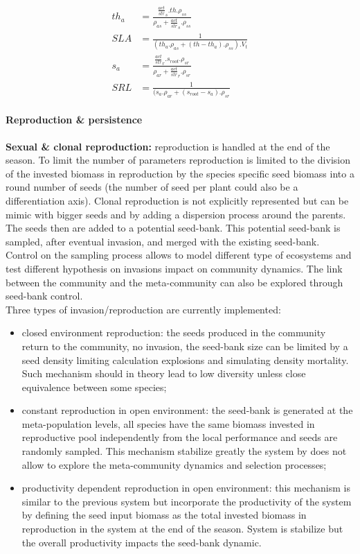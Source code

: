 \documentclass[a4paper,twoside, justified,marginals=raggedright]{tufte-handout}
\begin{document}
\begin{align}
  th_{a} &= \frac{\frac{act}{str}_{s} . th . \rho_{ss}}{\rho_{as} + \frac{act}{str}_{s} . \rho_{ss} }\\
  SLA &= \frac{1}{(th_{a} . \rho_{as} + (th - th_{a}) . \rho_{ss} ) . V_{t}}\\ 
  s_{a} &= \frac{\frac{act}{str}_{r} . s_{root} . \rho_{sr} }{ \rho_{ar} + \frac{act}{str}_{r} . \rho_{sr}}\\
  SRL &= \frac{1}{(s_{a} . \rho_{ar} + (s_{root} - s_{a}) . \rho_{sr}}
\end{align}



\paragraph{Reproduction \& persistence}
\textbf{Sexual \& clonal reproduction:} reproduction is handled at the end of the season. To limit the number of parameters reproduction is limited to the division of the invested biomass in reproduction by the species specific seed biomass into a round number of seeds (the number of seed per plant could also be a differentiation axis). Clonal reproduction is not explicitly represented but can be mimic with bigger seeds and by adding a dispersion process around the parents. The seeds then are added to a potential seed-bank. This potential seed-bank is sampled, after eventual invasion, and merged with the existing seed-bank.\\
\indent Control on the sampling process allows to model different type of ecosystems and test different hypothesis on invasions impact on community dynamics. The link between the community and the meta-community can also be explored through seed-bank control.\\
\indent Three types of invasion/reproduction are currently implemented:
\begin{itemize}
\item closed environment reproduction: the seeds produced in the community return to the community, no invasion, the seed-bank size can be limited by a seed density limiting calculation explosions and simulating density mortality. Such mechanism should in theory lead to low diversity unless close equivalence between some species;
\item constant reproduction in open environment: the seed-bank is generated at the meta-population levels, all species have the same biomass invested in reproductive pool independently from the local performance and seeds are randomly sampled. This mechanism stabilize greatly the system by does not allow to explore the meta-community dynamics and selection processes;
\item productivity dependent reproduction in open environment: this mechanism is similar to the previous system but incorporate the productivity of the system by defining the seed input biomass as the total invested biomass in reproduction in the system at the end of the season. System is stabilize but the overall productivity impacts the seed-bank dynamic.
\end{itemize}
\end{document}
